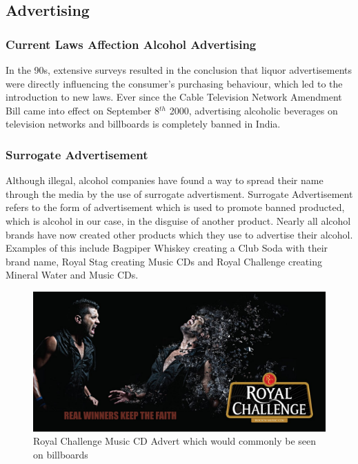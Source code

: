 \documentclass{article}
\begin{document}
\subsection{Advertising}
\subsubsection{Current Laws Affection Alcohol Advertising}
In the 90s, extensive surveys resulted in the conclusion that liquor advertisements
were directly influencing the consumer's purchasing behaviour, which led to the 
introduction to new laws. Ever since the Cable Television Network Amendment Bill 
came into effect on September 8$^{th}$ 2000, advertising alcoholic beverages on 
television networks and billboards is completely banned in India. 

\subsubsection{Surrogate Advertisement}
Although illegal, alcohol companies have found a way to spread their name through
the media by the use of surrogate advertisment. Surrogate Advertisement refers
to the form of advertisement which is used to promote banned producted, which is
alcohol in our case, in the disguise of another product. 
Nearly all alcohol brands have now created other products which they use to advertise
their alcohol. Examples of this include Bagpiper Whiskey creating a Club Soda with
their brand name, Royal Stag creating Music CDs and Royal Challenge creating Mineral
Water and Music CDs.

\begin{figure}[h!]
	\caption{Royal Challenge Music CD Advert which would commonly be seen on billboards}
	\centering
		\includegraphics[width=\textwidth]{rcad1.jpg}
\end{figure}
\end{document}
